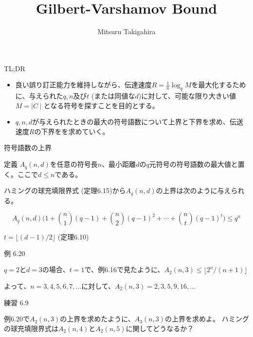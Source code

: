 \documentclass[dvipdfmx,10pt,jsarticle]{beamer}
\title{Gilbert-Varshamov Bound}
\author{Mitsuru Takigahira}
\date[2017/09/22]{}
\begin{document}
\frame{\maketitle}
  \begin{frame}{TL;DR}
    \begin{itemize}
      \item 良い誤り訂正能力を維持しながら、伝達速度$R = \frac{1}{n} \log_q M$を最大化するために、与えられた$q, n$及び$t $ (または同値な$d$)に対して、可能な限り大きい値$M = \mid C \mid $となる符号を探すことを目的とする。
      \item $q, n, d$が与えられたときの最大の符号語数について上界と下界を求め、伝送速度$R$の下界をを求めていく。
    \end{itemize}

  \end{frame}
  \begin{frame}{符号語数の上界}
    
    \begin{block}{定義}
      $A_q (n, d)$を任意の符号長$n$、最小距離$d$の$q$元符号の符号語数の最大値と置く。ここで$d \leq n$である。
    \end{block}

    ハミングの球充填限界式 (定理6.15)から$A_q (n, d)$の上界は次のように与えられる。

    \[A_q (n, d) \big(1 + \binom n1 (q - 1) + \binom n2 {(q - 1)}^2 + \cdots + \binom nt {(q - 1)}^t \big) \leq q^n\]

    $t = \lfloor (d - 1) / 2 \rfloor$ (定理6.10)
  \end{frame}

  \begin{frame}{例 6.20}
      
    $q = 2$と$d = 3$の場合、$t = 1$で、例6.16で見たように、$A_2 (n, 3) \leq \lfloor 2^n / (n + 1) \rfloor$

    よって、$n = 3, 4, 5, 6, 7, \dots $に対して、$A_2 (n, 3) = 2, 3, 5, 9, 16, \dots $

    \vspace{1cm}

      \begin{block}{練習 6.9}
        
      例6.20で$A_2 (n, 3)$の上界を求めたように、$A_3(n, 3)$の上界を求めよ。
      ハミングの球充填限界式は$A_2 (n, 4)$と$A_2 (n,5)$に関してどうなるか？ \\
      \end{block}
  \end{frame}
\end{document}
